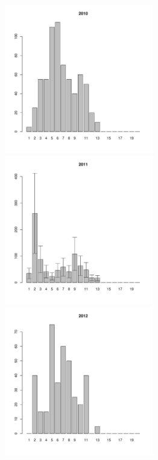 \documentclass[12pt, a4paper]{article}
\begin{document}
\begin{figure}[h]

\begin{multicols}{3}
\hfill
\includegraphics[width=65mm]{../White_Sea/Luvenga_Goreliy/midlow_2010_.pdf}
\hfill
\end{multicols}

\begin{multicols}{3}
\hfill
\includegraphics[width=65mm]{../White_Sea/Luvenga_Goreliy/midlow_2011_.pdf}
\end{multicols}



\begin{multicols}{3}
\hfill
\includegraphics[width=65mm]{../White_Sea/Luvenga_Goreliy/midlow_2012_.pdf}
\end{multicols}


\end{figure}
\end{document}
